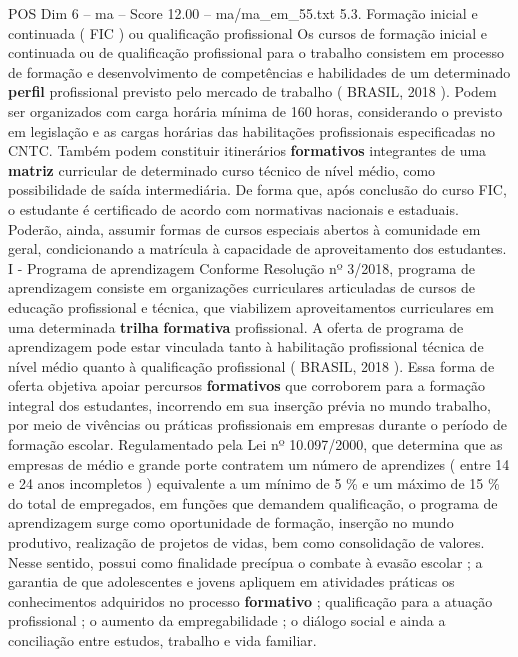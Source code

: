 \begin{textsample}{POS Dim 6 – ma – Score 12.00 – ma/ma\_em\_55.txt}  \label{ex:f6_pos_091}
5.3.
Formação inicial e continuada ( FIC ) ou qualificação profissional Os cursos de formação inicial e continuada ou de qualificação profissional para o trabalho consistem em processo de formação e desenvolvimento de competências e habilidades de um determinado \textbf{perfil} profissional previsto pelo mercado de trabalho ( BRASIL, 2018 ).
Podem ser organizados com carga horária mínima de 160 horas, considerando o previsto em legislação e as cargas horárias das habilitações profissionais especificadas no CNTC.
Também podem constituir itinerários \textbf{formativos} integrantes de uma \textbf{matriz} curricular de determinado curso técnico de nível médio, como possibilidade de saída intermediária.
De forma que, após conclusão do curso FIC, o estudante é certificado de acordo com normativas nacionais e estaduais.
Poderão, ainda, assumir formas de cursos especiais abertos à comunidade em geral, condicionando a matrícula à capacidade de aproveitamento dos estudantes.
I - Programa de aprendizagem Conforme Resolução nº 3/2018, programa de aprendizagem consiste em organizações curriculares articuladas de cursos de educação profissional e técnica, que viabilizem aproveitamentos curriculares em uma determinada \textbf{trilha} \textbf{formativa} profissional.
A oferta de programa de aprendizagem pode estar vinculada tanto à habilitação profissional técnica de nível médio quanto à qualificação profissional ( BRASIL, 2018 ).
Essa forma de oferta objetiva apoiar percursos \textbf{formativos} que corroborem para a formação integral dos estudantes, incorrendo em sua inserção prévia no mundo trabalho, por meio de vivências ou práticas profissionais em empresas durante o período de formação escolar.
Regulamentado pela Lei nº 10.097/2000, que determina que as empresas de médio e grande porte contratem um número de aprendizes ( entre 14 e 24 anos incompletos ) equivalente a um mínimo de 5 \% e um máximo de 15 \% do total de empregados, em funções que demandem qualificação, o programa de aprendizagem surge como oportunidade de formação, inserção no mundo produtivo, realização de projetos de vidas, bem como consolidação de valores.
Nesse sentido, possui como finalidade precípua o combate à evasão escolar ; a garantia de que adolescentes e jovens apliquem em atividades práticas os conhecimentos adquiridos no processo \textbf{formativo} ; qualificação para a atuação profissional ; o aumento da empregabilidade ; o diálogo social e ainda a conciliação entre estudos, trabalho e vida familiar.

\end{textsample}

